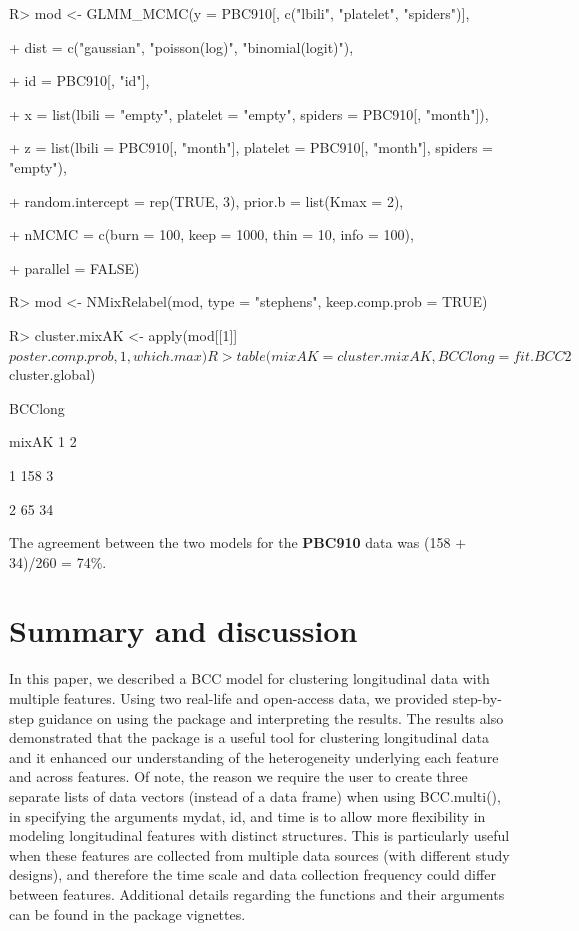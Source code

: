 \begin{example}

R> mod <- GLMM_MCMC(y = PBC910[, c("lbili", "platelet", "spiders")],

+        dist = c("gaussian", "poisson(log)", "binomial(logit)"),

+        id = PBC910[, "id"], 

+        x = list(lbili = "empty", platelet = "empty", spiders = PBC910[, "month"]), 

+        z = list(lbili = PBC910[, "month"], platelet = PBC910[, "month"], spiders = "empty"),

+        random.intercept = rep(TRUE, 3), prior.b = list(Kmax = 2),

+        nMCMC = c(burn = 100, keep = 1000, thin = 10, info = 100),

+        parallel = FALSE)

R> mod <- NMixRelabel(mod, type = "stephens", keep.comp.prob = TRUE)

R> cluster.mixAK <- apply(mod[[1]]$poster.comp.prob, 1, which.max)

R> table(mixAK = cluster.mixAK, BCClong = fit.BCC2$cluster.global)

\end{example} 

\begin{example}

     BCClong

mixAK   1   2

    1 158   3

    2  65  34

\end{example}

The agreement between the two models for the \textbf{PBC910} data was (158 + 34)/260 = 74\%.

\section{Summary and discussion} \label{sec:summary}

In this paper, we described a BCC model for clustering longitudinal data with multiple features. Using two real-life and open-access data, we provided step-by-step guidance on using the  package and interpreting the results. The results also demonstrated that the  package is a useful tool for clustering longitudinal data and it enhanced our understanding of the heterogeneity underlying each feature and across features. Of note, the reason we require the user to create three separate lists of data vectors (instead of a data frame) when using BCC.multi(), in specifying the arguments mydat, id, and time is to allow more flexibility in modeling longitudinal features with distinct structures. This is particularly useful when these features are collected from multiple data sources (with different study designs), and therefore the time scale and data collection frequency could differ between features. Additional details regarding the functions and their arguments can be found in the package vignettes.

